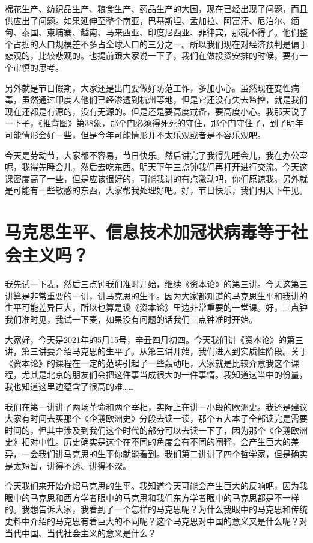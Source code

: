\documentclass[UTF8, 12pt, a4paper]{ctexrep}
\begin{document}
棉花生产、纺织品生产、粮食生产、药品生产的大国，现在已经出现了问题，而且供应出了问题。如果延伸至整个南亚，巴基斯坦、孟加拉、阿富汗、尼泊尔、缅甸、泰国、柬埔寨、越南、马来西亚、印度尼西亚、菲律宾，那就不得了。他们整个占据的人口规模差不多占全球人口的三分之一。所以我们现在对经济预判是偏于悲观的，比较悲观的。也提前跟大家说一下子，我们在做投资安排的时候，要有一个审慎的思考。

另外就是节日假期，大家还是出门要做好防范工作，多加小心。虽然现在变性病毒，虽然通过印度人他们已经渗透到杭州等地，但是它还没有失去监控，就是我们现在还都是有源的，没有无源的。但是还是要高度戒备，要高度小心。我那天说了一下子，《推背图》第38象，那个门必须得死死的守住，那个门守住了，到了明年可能情形会好一些，但是今年可能情形并不太乐观或者是不容乐观吧。

今天是劳动节，大家都不容易，节日快乐。然后讲完了我得先睡会儿，我在办公室呢，我得先睡会儿，然后去吃东西。明天下午三点钟我们再打开进行交流。今天这课密度高了一些，但是应该很好的，可能我讲的有点激动吧，你们原谅我。另外就是可能有一些敏感的东西，大家帮我处理好吧。好，节日快乐，我们明天下午见。

\section{马克思生平、信息技术加冠状病毒等于社会主义吗？}

我先试一下麦，然后三点钟我们准时开始，继续《资本论》的第三讲。今天这第三讲算是非常重要的一讲，讲马克思的生平。因为大家都知道的马克思生平和我讲的生平可能差异巨大，所以也算是谈《资本论》里边非常重要的一堂课。好，三点钟我们准时见，我试一下麦，如果没有问题的话我们三点钟准时开始。

大家好，今天是2021年的5月15号，辛丑四月初四。今天我们讲《资本论》的第三讲，第三讲要介绍马克思的生平了。从第三讲开始，我们进入到实质性阶段。关于《资本论》的课程在一定的范畴引起了一些轰动吧，大家就是比较介意我这个课程，尤其是北京的朋友们会把这件事当成很大的一件事情。我知道这当中的份量，我也知道这里边蕴含了很高的难……

我们在第一讲讲了两场革命和两个宰相，实际上在讲一小段的欧洲史。我还是建议大家有时间去买那个《企鹅欧洲史》分段去读一读，那个五大本子全部读完是需要时间的，但其中涉及到我们这个时代的部分可以去读一下子，因为那个《企鹅欧洲史》相对中性。历史确实是这个在不同的角度会有不同的阐释，会产生巨大的差异，一会我们讲马克思的生平你就能看到。我们第二讲讲了四个哲学家，但是确实是太短暂，讲得不透、讲得不深。

今天我们来开始介绍马克思的生平。我知道今天可能会产生巨大的反响吧，因为我眼中的马克思和西方学者眼中的马克思和我们东方学者眼中的马克思都是不一样的。我想告诉大家，我看到了一个怎样的马克思呢？为什么我眼中的马克思和传统史料中介绍的马克思有着巨大的不同呢？这个马克思对中国的意义又是什么呢？对当代中国、当代社会主义的意义是什么？
\end{document}
